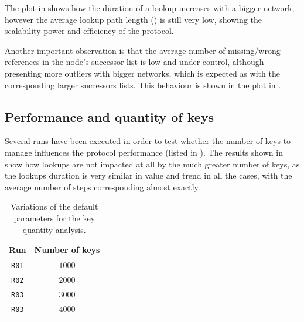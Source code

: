 \documentclass[11pt,twocolumn,letterpaper]{article}
\begin{document}
	The plot in  shows how the duration of a lookup increases with a bigger network, however the average lookup path length () is still very low, showing the scalability power and efficiency of the protocol.
	
	Another important observation is that the average number of missing/wrong references in the node's successor list is low and under control, although presenting more outliers with bigger networks, which is expected as with the corresponding larger successors lists. This behaviour is shown in the plot in .

	
	\subsection{Performance and quantity of keys}
	\label{subsec:keyno_analysis}
	Several runs have been executed in order to test whether the number of keys to manage influences the protocol performance (listed in ). The results shown in  show how lookups are not impacted at all by the much greater number of keys, as the lookups duration is very similar in value and trend in all the cases, with the average number of steps corresponding almost exactly.
	\begin{table}[t]
		\caption{Variations of the default parameters for the key quantity analysis.}
		\label{tab:keyno_runs}
		\centering
		\begin{tabular}{cc}
			\hline
			\textbf{Run} & \textbf{Number of keys}\\
			\hline
			\texttt{R01} & $1000$\\
			\hline
			\texttt{R02} & $2000$\\
			\hline
			\texttt{R03} & $3000$\\
			\hline
			\texttt{R03} & $4000$\\
			\hline
		\end{tabular}
	\end{table}		
\end{document}
